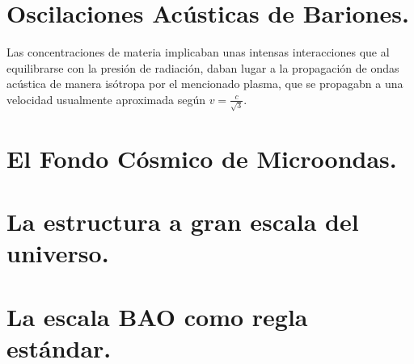 
\section{Oscilaciones Acústicas de Bariones.}
Las concentraciones de materia implicaban unas intensas interacciones que al equilibrarse con la presión de radiación, daban lugar a la propagación de ondas acústica de manera isótropa por el mencionado plasma, que se propagabn a una velocidad usualmente aproximada según $v = \frac{c}{\sqrt{3} }$. 

\section{El Fondo Cósmico de Microondas.}

\section{La estructura a gran escala del universo.}

\section{La escala BAO como regla estándar.}





